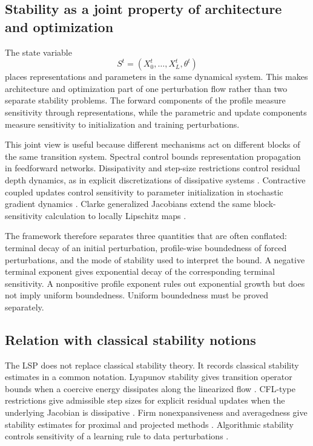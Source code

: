\documentclass{article}
\numberwithin{equation}{section}
\begin{document}
\subsection{Stability as a joint property of architecture and optimization}
\label{subsec:joint-architecture-optimization}

The state variable
\[
S^t=(X_0^t,\ldots,X_L^t,\theta^t)
\]
places representations and parameters in the same dynamical system. This makes architecture and optimization part of one perturbation flow rather than two separate stability problems. The forward components of the profile measure sensitivity through representations, while the parametric and update components measure sensitivity to initialization and training perturbations.

This joint view is useful because different mechanisms act on different blocks of the same transition system. Spectral control bounds representation propagation in feedforward networks. Dissipativity and step-size restrictions control residual depth dynamics, as in explicit discretizations of dissipative systems \cite{Strikwerda2004,HaberRuthotto2017}. Contractive coupled updates control sensitivity to parameter initialization in stochastic gradient dynamics \cite{KushnerYin2003,BottouCurtisNocedal2018}. Clarke generalized Jacobians extend the same block-sensitivity calculation to locally Lipschitz maps \cite{Clarke1990Optimization,Clarke1998Nonsmooth}.

The framework therefore separates three quantities that are often conflated: terminal decay of an initial perturbation, profile-wise boundedness of forced perturbations, and the mode of stability used to interpret the bound. A negative terminal exponent gives exponential decay of the corresponding terminal sensitivity. A nonpositive profile exponent rules out exponential growth but does not imply uniform boundedness. Uniform boundedness must be proved separately.

\subsection{Relation with classical stability notions}
\label{subsec:classical-stability-relations}

The LSP does not replace classical stability theory. It records classical stability estimates in a common notation. Lyapunov stability gives transition operator bounds when a coercive energy dissipates along the linearized flow \cite{Khalil2002Nonlinear,Angeli2002Incremental}. CFL-type restrictions give admissible step sizes for explicit residual updates when the underlying Jacobian is dissipative \cite{Strikwerda2004}. Firm nonexpansiveness and averagedness give stability estimates for proximal and projected methods \cite{BauschkeCombettes2011}. Algorithmic stability controls sensitivity of a learning rule to data perturbations \cite{Bousquet2002,Hardt2016Train}.
\end{document}

